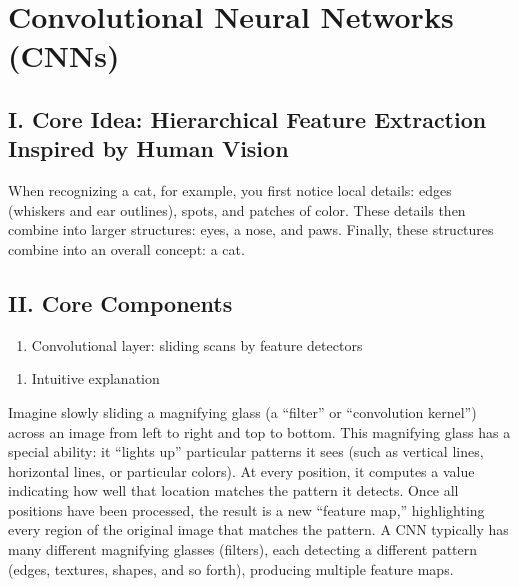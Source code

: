 \setcounter{section}{0}

\hypertarget{convolutional-neural-networks-cnns}{%
\section{Convolutional Neural Networks (CNNs)}\label{convolutional-neural-networks-cnns}}

\hypertarget{i.-core-idea-hierarchical-feature-extraction-inspired-by-human-vision}{%
\subsection{I. Core Idea: Hierarchical Feature Extraction Inspired by Human Vision}\label{i.-core-idea-hierarchical-feature-extraction-inspired-by-human-vision}}

When recognizing a cat, for example, you first notice local details: edges (whiskers and ear outlines), spots, and patches of color. These details then combine into larger structures: eyes, a nose, and paws. Finally, these structures combine into an overall concept: a cat.

\hypertarget{ii.-core-components}{%
\subsection{II. Core Components}\label{ii.-core-components}}

\begin{enumerate}
\def\labelenumi{\arabic{enumi}.}
\tightlist
\item
  Convolutional layer: sliding scans by feature detectors
\end{enumerate}

\begin{enumerate}
\def\labelenumi{(\arabic{enumi})}
\tightlist
\item
  Intuitive explanation
\end{enumerate}

Imagine slowly sliding a magnifying glass (a ``filter'' or ``convolution kernel'') across an image from left to right and top to bottom. This magnifying glass has a special ability: it ``lights up'' particular patterns it sees (such as vertical lines, horizontal lines, or particular colors). At every position, it computes a value indicating how well that location matches the pattern it detects. Once all positions have been processed, the result is a new ``feature map,'' highlighting every region of the original image that matches the pattern. A CNN typically has many different magnifying glasses (filters), each detecting a different pattern (edges, textures, shapes, and so forth), producing multiple feature maps.

